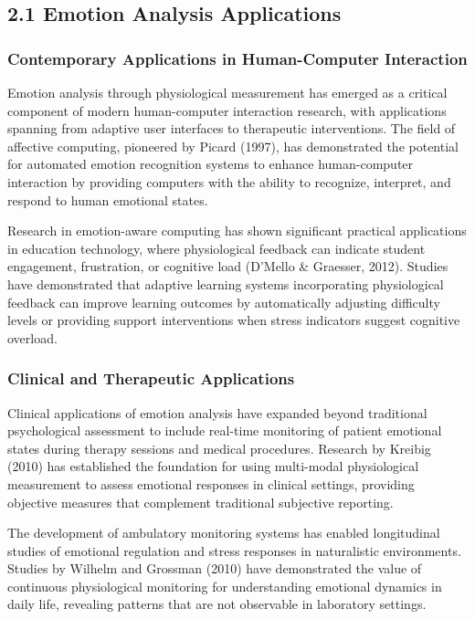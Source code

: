 \documentclass[12pt,a4paper]{article}
\begin{document}
\subsection{2.1 Emotion Analysis Applications}

\subsubsection{Contemporary Applications in Human-Computer Interaction}

Emotion analysis through physiological measurement has emerged as a critical component of modern human-computer
interaction research, with applications spanning from adaptive user interfaces to therapeutic interventions. The field
of affective computing, pioneered by Picard (1997), has demonstrated the potential for automated emotion recognition
systems to enhance human-computer interaction by providing computers with the ability to recognize, interpret, and
respond to human emotional states.

Research in emotion-aware computing has shown significant practical applications in education technology, where
physiological feedback can indicate student engagement, frustration, or cognitive load (D'Mello \& Graesser, 2012).
Studies have demonstrated that adaptive learning systems incorporating physiological feedback can improve learning
outcomes by automatically adjusting difficulty levels or providing support interventions when stress indicators suggest
cognitive overload.

\subsubsection{Clinical and Therapeutic Applications}

Clinical applications of emotion analysis have expanded beyond traditional psychological assessment to include real-time
monitoring of patient emotional states during therapy sessions and medical procedures. Research by Kreibig (2010) has
established the foundation for using multi-modal physiological measurement to assess emotional responses in clinical
settings, providing objective measures that complement traditional subjective reporting.

The development of ambulatory monitoring systems has enabled longitudinal studies of emotional regulation and stress
responses in naturalistic environments. Studies by Wilhelm and Grossman (2010) have demonstrated the value of continuous
physiological monitoring for understanding emotional dynamics in daily life, revealing patterns that are not observable
in laboratory settings.
\end{document}

